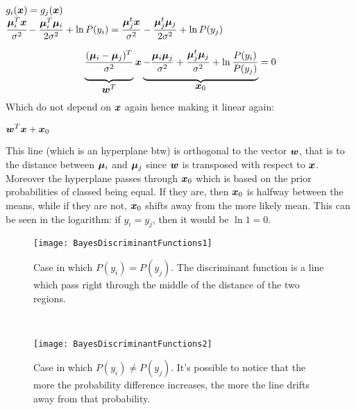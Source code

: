 \begin{center}
	$\displaystyle g_i(\bm{x})=g_j(\bm{x})$\\
	$\displaystyle \cfrac{\bm{\mu}_i^T\bm{x}}{\sigma^2}-\frac{\bm{\mu}_i^T\bm{\mu}_i}{2\sigma^2}+\ln{P(y_i)}= \frac{\bm{\mu}_j^t\bm{x}}{\sigma^2}-\frac{\bm{\mu}_j^t\bm{\mu}_j}{2\sigma^2}+\ln{P(y_j)}$\\
\end{center}
\begin{equation}
	\underbrace{\frac{(\vect{\mu}_i-\vect{\mu}_j)^T}{\sigma^2}\rule[-12pt]{0pt}{5pt}}_{\mbox{$\vect{w}^T$}}
	\vect{x}
	\underbrace{-\frac{\vect{\mu}_i\vect{\mu}_j}{\sigma^2}+\frac{\vect{\mu}_j^t\vect{\mu}_j}{\sigma^2}+\ln{\frac{P(y_i)}{P(y_j)}}\rule[-12pt]{0pt}{5pt}}_{\mbox{$\vect{x}_0$}}
	=0
\end{equation}
Which do not depend on $\bm{x}$ again hence making it linear again:
\begin{center}
	$\displaystyle \bm{w}^T\bm{x}+\bm{x}_0$
\end{center}
This line (which is an hyperplane btw) is orthogonal to the vector $\bm{w}$, that is to the distance between $\bm{\mu}_i$ and $\bm{\mu}_j$ since $\bm{w}$ is transposed with respect to $\bm{x}$.\newline
Moreover the hyperplane passes through $\bm{x}_0$ which is based on the prior probabilities of classed being equal. If they are, then $\bm{x}_0$ is halfway between the means, while if they are not, $\bm{x}_0$ shifts away from the more likely mean. This can be seen in the logarithm: if $y_i=y_j$, then it would be $\ln{1}=0$.\newline
\begin{figure}[htp]
	\begin{minipage}{\linewidth}
		\texttt{[image: BayesDiscriminantFunctions1]}
		\caption{Case in which $P(y_i)=P(y_j)$. The discriminant function is a line which pass right through the middle of the distance of the two regions.}
	\end{minipage}
\end{figure}\\
\begin{figure}[htp]
	\begin{minipage}{\linewidth}
		\texttt{[image: BayesDiscriminantFunctions2]}
		\caption{Case in which $P(y_i)\neq P(y_j)$. It's possible to notice that the more the probability difference increases, the more the line drifts away from that probability.}
	\end{minipage}
\end{figure}
